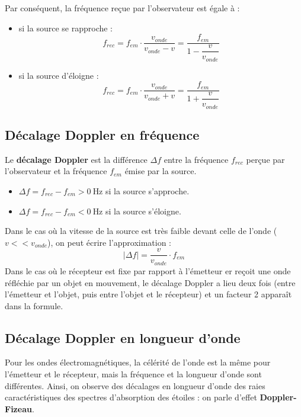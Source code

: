 \documentclass[a4paper,11pt,fleqn]{article}%
\begin{document}
Par conséquent, la fréquence reçue par l'observateur est égale à :
\begin{itemize}
	\item si la source se rapproche : $$f_{rec}=f_{em}\cdot \dfrac{v_{onde}}{v_{onde}-v} = \dfrac{f_{em}}{1-\dfrac{v}{v_{onde}}}$$
	\item si la source d'éloigne : $$f_{rec}=f_{em}\cdot \dfrac{v_{onde}}{v_{onde}+v} = \dfrac{f_{em}}{1+\dfrac{v}{v_{onde}}}$$
\end{itemize}

\subsection{Décalage Doppler en fréquence}
Le \textbf{décalage Doppler} est la différence $\Delta f$ entre la fréquence $f_{rec}$ perçue par l'observateur et la fréquence $f_{em}$ émise par la source.
\begin{itemize}
	\item $\Delta f = f_{rec} - f_{em}> \SI{0}{\hertz}$ si la source s'approche.
	\item $\Delta f = f_{rec} - f_{em}< \SI{0}{\hertz}$ si la source s'éloigne.
\end{itemize}

Dans le cas où la vitesse de la source est très faible devant celle de l'onde ($v<<v_{onde}$), on peut écrire l'approximation :
$$ |\Delta f | = \dfrac{v}{v_{onde}} \cdot f_{em}$$
Dans le cas où le récepteur est fixe par rapport à l'émetteur er reçoit une onde réfléchie par un objet en mouvement, le décalage Doppler a lieu deux fois (entre l'émetteur et l'objet, puis entre l'objet et le récepteur) et un facteur 2 apparaît dans la formule.

\subsection{Décalage Doppler en longueur d'onde}

Pour les ondes électromagnétiques, la célérité de l'onde est la même pour l'émetteur et le récepteur, mais la fréquence et la longueur d'onde sont différentes. Ainsi, on observe des décalages en longueur d'onde des raies caractéristiques des spectres d'absorption des étoiles : on parle d'effet \textbf{Doppler-Fizeau}.
\end{document}
